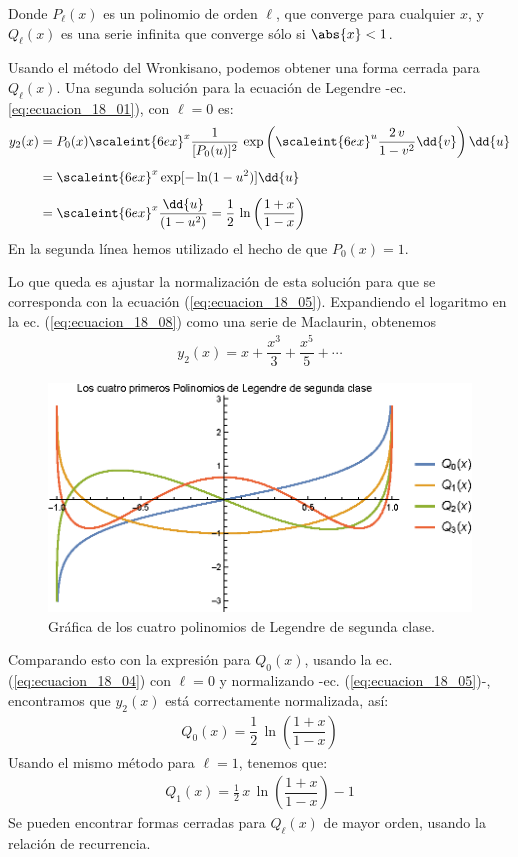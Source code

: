 Donde $P_{\ell} (x)$ es un polinomio de orden $\ell$, que converge para cualquier $x$, y $Q_{\ell} (x)$ es una serie infinita que converge sólo si $\abs{x} < 1$.
\par
Usando el método del Wronkisano, podemos obtener una forma cerrada para $Q_{\ell} (x)$. Una segunda solución para la ecuación de Legendre -ec. \ref{eq:ecuacion_18_01}), con $\ell = 0$ es:
\begin{align}
\begin{aligned}[b]
y_{2} (x) &= P_{0} (x) \scaleint{6ex}^{x} \dfrac{1}{[P_{0} (u)]^{2}} \, \exp \left( \scaleint{6ex}^{u} \dfrac{2 \, v}{1 - v^{2}} \dd{v} \right) \dd{u} \\[0.5em]
&= \scaleint{6ex}^{x} \exp [ - \ln (1 - u^{2}) ] \dd{u} \\[0.5em]
&= \scaleint{6ex}^{x} \dfrac{\dd{u}}{(1 - u^{2})} = \dfrac{1}{2} \, \ln \left( \dfrac{1 + x}{1 - x} \right)
\end{aligned}
\label{eq:ecuacion_18_08}
\end{align}
En la segunda línea hemos utilizado el hecho de que $P_{0} (x) = 1$.
\par
Lo que queda es ajustar la normalización de esta solución para que se corresponda con la ecuación (\ref{eq:ecuacion_18_05}). Expandiendo el logaritmo en la ec. (\ref{eq:ecuacion_18_08}) como una serie de Maclaurin, obtenemos
\begin{align*}
y_{2}(x) = x + \dfrac{x^{3}}{3} + \dfrac{x^{5}}{5} + \cdots \end{align*}
\begin{figure}[H]
    \centering
    \includegraphics[scale=1.2]{Imagenes/Plot_LagrangeSC_0-4.eps}
    \caption{Gráfica de los cuatro polinomios de Legendre de segunda clase.}
    \label{fig:polinomios_Lagrange_02}
\end{figure}
Comparando esto con la expresión para $Q_{0} (x)$, usando la ec. (\ref{eq:ecuacion_18_04}) con $\ell = 0$ y normalizando -ec. (\ref{eq:ecuacion_18_05})-, encontramos que $y_{2} (x)$ está correctamente normalizada, así:
\begin{align*}
Q_{0} (x) = \dfrac{1}{2} \, \ln \left( \dfrac{1 + x}{1 - x} \right)
\end{align*}
Usando el mismo método para $\ell = 1$, tenemos que:
\begin{align*}
Q_{1} (x) =  \frac{1}{2} \, x \,  \ln \left( \dfrac{1 + x}{1 - x} \right) - 1
\end{align*}
Se pueden encontrar formas cerradas para $Q_{\ell} (x)$ de mayor orden, usando la relación de recurrencia.


